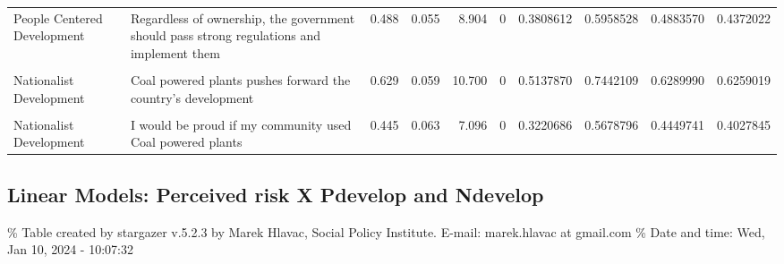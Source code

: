 \documentclass[
]{article}
\begin{document}
\begin{landscape}
\begin{table}[!h]
{\begin{tabular}[t]{l>{\raggedright\arraybackslash}p{4cm}rrrrrrrr}
\addlinespace
People Centered Development & Regardless of ownership, the government should pass strong regulations and implement them & 0.488 & 0.055 & 8.904 & 0 & 0.3808612 & 0.5958528 & 0.4883570 & 0.4372022\\
\cellcolor{gray!6}{People Centered Development} & \cellcolor{gray!6}{Rapid mechanization of work is taking away jobs from workers in this country} & \cellcolor{gray!6}{0.658} & \cellcolor{gray!6}{0.056} & \cellcolor{gray!6}{11.805} & \cellcolor{gray!6}{0} & \cellcolor{gray!6}{0.5489483} & \cellcolor{gray!6}{0.7675273} & \cellcolor{gray!6}{0.6582378} & \cellcolor{gray!6}{0.5598383}\\
Nationalist Development & Coal powered plants pushes forward the country's development & 0.629 & 0.059 & 10.700 & 0 & 0.5137870 & 0.7442109 & 0.6289990 & 0.6259019\\
\cellcolor{gray!6}{Nationalist Development} & \cellcolor{gray!6}{Coal powered plants brings economic prosperity to the surrounding regions} & \cellcolor{gray!6}{0.596} & \cellcolor{gray!6}{0.058} & \cellcolor{gray!6}{10.338} & \cellcolor{gray!6}{0} & \cellcolor{gray!6}{0.4830019} & \cellcolor{gray!6}{0.7090010} & \cellcolor{gray!6}{0.5960014} & \cellcolor{gray!6}{0.5996861}\\
Nationalist Development & I would be proud if my community used Coal powered plants & 0.445 & 0.063 & 7.096 & 0 & 0.3220686 & 0.5678796 & 0.4449741 & 0.4027845\\
\bottomrule
\end{tabular}}
\end{table}
\end{landscape}

\newpage

\hypertarget{linear-models-perceived-risk-x-pdevelop-and-ndevelop}{%
\subsection{Linear Models: Perceived risk X Pdevelop and
Ndevelop}\label{linear-models-perceived-risk-x-pdevelop-and-ndevelop}}

\begingroup\setlength{\tabcolsep}{1pt}\renewcommand{\arraystretch}{0.7}

\% Table created by stargazer v.5.2.3 by Marek Hlavac, Social Policy
Institute. E-mail: marek.hlavac at gmail.com \% Date and time: Wed, Jan
10, 2024 - 10:07:32
\end{document}
